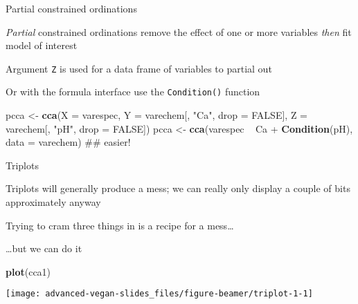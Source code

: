 \documentclass[10pt,ignorenonframetext,compress, aspectratio=169]{beamer}
\newenvironment{Shaded}{\begin{snugshade}}{\end{snugshade}}
\newcommand{\KeywordTok}[1]{\textcolor[rgb]{0.13,0.29,0.53}{\textbf{{#1}}}}
\newcommand{\DataTypeTok}[1]{\textcolor[rgb]{0.13,0.29,0.53}{{#1}}}
\newcommand{\StringTok}[1]{\textcolor[rgb]{0.31,0.60,0.02}{{#1}}}
\newcommand{\OtherTok}[1]{\textcolor[rgb]{0.56,0.35,0.01}{{#1}}}
\newcommand{\NormalTok}[1]{{#1}}
\begin{document}
\begin{frame}[fragile]{Partial constrained ordinations}

\emph{Partial} constrained ordinations remove the effect of one or more
variables \emph{then} fit model of interest

Argument \texttt{Z} is used for a data frame of variables to partial out

Or with the formula interface use the \texttt{Condition()} function

\scriptsize

\begin{Shaded}
\begin{Highlighting}[]
\NormalTok{pcca <-}\StringTok{ }\KeywordTok{cca}\NormalTok{(}\DataTypeTok{X =} \NormalTok{varespec,}
            \DataTypeTok{Y =} \NormalTok{varechem[, }\StringTok{"Ca"}\NormalTok{, }\DataTypeTok{drop =} \OtherTok{FALSE}\NormalTok{],}
            \DataTypeTok{Z =} \NormalTok{varechem[, }\StringTok{"pH"}\NormalTok{, }\DataTypeTok{drop =} \OtherTok{FALSE}\NormalTok{])}
\NormalTok{pcca <-}\StringTok{ }\KeywordTok{cca}\NormalTok{(varespec ~}\StringTok{ }\NormalTok{Ca +}\StringTok{ }\KeywordTok{Condition}\NormalTok{(pH), }\DataTypeTok{data =} \NormalTok{varechem) ## easier!}
\end{Highlighting}
\end{Shaded}

\normalsize

\end{frame}

\begin{frame}[fragile]{Triplots}

Triplots will generally produce a mess; we can really only display a
couple of bits approximately anyway

Trying to cram three things in is a recipe for a mess\ldots{}

\ldots{}but we can do it

\scriptsize

\begin{Shaded}
\begin{Highlighting}[]
\KeywordTok{plot}\NormalTok{(cca1)}
\end{Highlighting}
\end{Shaded}

\begin{center}\texttt{[image: advanced-vegan-slides\_files/figure-beamer/triplot-1-1]} \end{center}

\normalsize

\end{frame}
\end{document}
